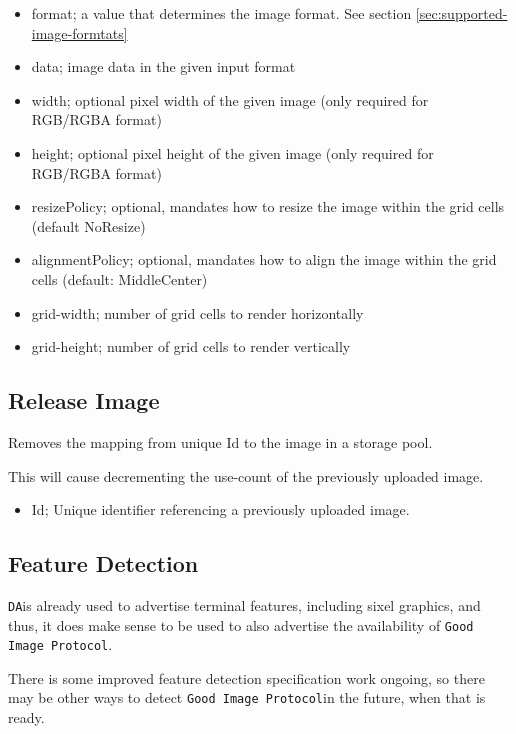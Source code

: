 \documentclass{article}
\newcommand{\code}[1]{\colorbox{light-gray}{\texttt{#1}}}
\newcommand{\DA}{\code{DA}}
\newcommand{\GoodImageProtocol}{\code{Good Image Protocol}}
\begin{document}
\begin{itemize}
    \item format; a value that determines the image format. See section \ref{sec:supported-image-formtats}
    \item data; image data in the given input format
    \item width; optional pixel width of the given image (only required for RGB/RGBA format)
    \item height; optional pixel height of the given image (only required for RGB/RGBA format)
    \item resizePolicy; optional, mandates how to resize the image within the grid cells (default NoResize)
    \item alignmentPolicy; optional, mandates how to align the image within the grid cells (default: MiddleCenter)
    \item grid-width; number of grid cells to render horizontally
    \item grid-height; number of grid cells to render vertically
\end{itemize}


\subsection{Release Image}

Removes the mapping from unique Id to the image in a storage pool.

This will cause decrementing the use-count of the previously uploaded image.

\begin{itemize}
    \item Id; Unique identifier referencing a previously uploaded image.
\end{itemize}

\subsection{Feature Detection}

\DA is already used to advertise terminal features, including sixel graphics, and thus,
it does make sense to be used to also advertise the availability of \GoodImageProtocol.

There is some improved feature detection specification work ongoing,
so there may be other ways to detect \GoodImageProtocol in the future, when that is ready.
\end{document}
